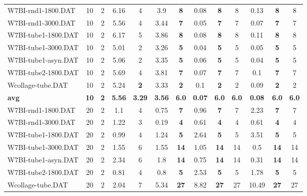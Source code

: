\begin{table}[h]
{\begin{tabular}{lcccccccccccc}
W7BI-rnd1-1800.DAT & 10 & 2 & 6.16 & 4 & 3.9 &  \textbf{8} &  \textcolor{blue2}{0.08} &  \textbf{8} & 8 & 0.13 &  \textbf{8} & 8 \\
W7BI-rnd1-3000.DAT & 10 & 2 & 5.56 & 4 & 3.44 &  \textbf{7} &  \textcolor{blue2}{0.05} &  \textbf{7} & 7 & 0.07 &  \textbf{7} & 7 \\
W7BI-tube1-1800.DAT & 10 & 2 & 6.17 & 5 & 3.86 &  \textbf{8} &  \textcolor{blue2}{0.08} &  \textbf{8} & 8 & 0.11 &  \textbf{8} & 8 \\
W7BI-tube1-3000.DAT & 10 & 2 & 5.01 & 2 & 3.26 &  \textbf{5} &  \textcolor{blue2}{0.04} &  \textbf{5} & 5 & 0.05 &  \textbf{5} & 5 \\
W7BI-tube1-asyn.DAT & 10 & 2 & 5.06 & 2 & 3.35 &  \textbf{5} & 0.06 &  \textbf{5} & 5 &  \textcolor{blue2}{0.04} &  \textbf{5} & 5 \\
W7BI-tube2-1800.DAT & 10 & 2 & 5.69 & 4 & 3.81 &  \textbf{7} &  \textcolor{blue2}{0.07} &  \textbf{7} & 7 & 0.1 &  \textbf{7} & 7 \\
Wcollage-tube.DAT & 10 & 2 & 5.24 &  \textbf{2} & 3.33 &  \textbf{2} & 0.1 &  \textbf{2} & 2 &  \textcolor{blue2}{0.09} &  \textbf{2} & 2 \\
\cline{1-13} \textbf{avg} & \textbf{10} & \textbf{2} & \textbf{5.56} & \textbf{3.29} & \textbf{3.56} & \textbf{6.0} & \textbf{0.07} & \textbf{6.0} & \textbf{6.0} & \textbf{0.08} & \textbf{6.0} & \textbf{6.0} \\ \cline{1-13}
W7BI-rnd1-1800.DAT & 20 & 2 & 1.1 & 4 &  \textcolor{blue2}{0.75} &  \textbf{7} & 0.96 &  \textbf{7} & 7 & 2.23 &  \textbf{7} & 7 \\
W7BI-rnd1-3000.DAT & 20 & 2 & 1.22 & 3 &  \textcolor{blue2}{0.19} &  \textbf{4} & 0.61 &  \textbf{4} & 4 & 0.61 &  \textbf{4} & 4 \\
W7BI-tube1-1800.DAT & 20 & 2 &  \textcolor{blue2}{0.99} & 4 & 1.24 &  \textbf{5} & 2.64 &  \textbf{5} & 5 & 3.51 &  \textbf{5} & 5 \\
W7BI-tube1-3000.DAT & 20 & 2 & 1.55 & 6 & 1.55 &  \textbf{14} & 1.05 &  \textbf{14} & 14 &  \textcolor{blue2}{0.5} &  \textbf{14} & 14 \\
W7BI-tube1-asyn.DAT & 20 & 2 & 2.34 & 6 & 1.8 &  \textbf{14} & 0.75 &  \textbf{14} & 14 &  \textcolor{blue2}{0.31} &  \textbf{14} & 14 \\
W7BI-tube2-1800.DAT & 20 & 2 & 0.81 & 4 &  \textcolor{blue2}{0.8} &  \textbf{5} & 2.53 &  \textbf{5} & 5 & 1.78 &  \textbf{5} & 5 \\
Wcollage-tube.DAT & 20 & 2 &  \textcolor{blue2}{2.04} & 7 & 5.34 &  \textbf{27} & 8.82 &  \textbf{27} & 27 & 10.49 &  \textbf{27} & 27 \\

\end{tabular}}
\end{table}
